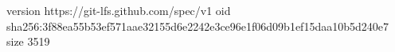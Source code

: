 version https://git-lfs.github.com/spec/v1
oid sha256:3f88ea55b53ef571aae32155d6e2242e3ce96e1f06d09b1ef15daa10b5d240e7
size 3519
